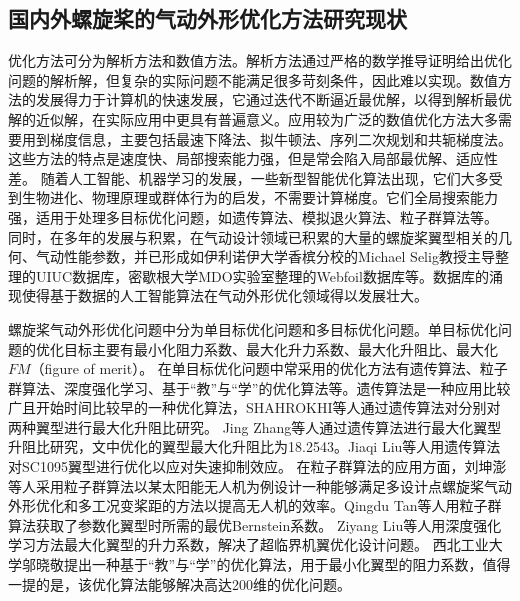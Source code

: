 \vspace{0.8em}
\subsection{国内外螺旋桨的气动外形优化方法研究现状}\label{Sec: optimization}
\vspace{0.8em}

优化方法可分为解析方法和数值方法。解析方法通过严格的数学推导证明给出优化问题的解析解，但复杂的实际问题不能满足很多苛刻条件，因此难以实现。数值方法的发展得力于计算机的快速发展，它通过迭代不断逼近最优解，以得到解析最优解的近似解，在实际应用中更具有普遍意义。应用较为广泛的数值优化方法大多需要用到梯度信息，主要包括最速下降法、拟牛顿法、序列二次规划和共轭梯度法。这些方法的特点是速度快、局部搜索能力强，但是常会陷入局部最优解、适应性差。
随着人工智能、机器学习的发展，一些新型智能优化算法出现，它们大多受到生物进化、物理原理或群体行为的启发，不需要计算梯度。它们全局搜索能力强，适用于处理多目标优化问题，如遗传算法、模拟退火算法、粒子群算法等。
同时，在多年的发展与积累，在气动设计领域已积累的大量的螺旋桨翼型相关的几何、气动性能参数，并已形成如伊利诺伊大学香槟分校的Michael Selig教授主导整理的UIUC数据库，密歇根大学MDO实验室整理的Webfoil数据库等。数据库的涌现使得基于数据的人工智能算法在气动外形优化领域得以发展壮大\cite{Oliveira2023}。

螺旋桨气动外形优化问题中分为单目标优化问题和多目标优化问题。单目标优化问题的优化目标主要有最小化阻力系数、最大化升力系数、最大化升阻比、最大化$FM$（figure of merit）。
在单目标优化问题中常采用的优化方法有遗传算法、粒子群算法、深度强化学习、基于“教”与“学”的优化算法等。遗传算法是一种应用比较广且开始时间比较早的一种优化算法，SHAHROKHI等人通过遗传算法对分别对两种翼型进行最大化升阻比研究\cite{Shahrokhi2007}。
Jing Zhang等人通过遗传算法进行最大化翼型升阻比研究\cite{Zhang2021}，文中优化的翼型最大化升阻比为18.2543。Jiaqi Liu等人用遗传算法对SC1095翼型进行优化以应对失速抑制效应\cite{Liu2023}。
在粒子群算法的应用方面，刘坤澎等人采用粒子群算法以某太阳能无人机为例设计一种能够满足多设计点螺旋桨气动外形优化和多工况变桨距的方法以提高无人机的效率\cite{LiuKP2023}。Qingdu Tan等人用粒子群算法获取了参数化翼型时所需的最优Bernstein系数\cite{Tan2022}。
Ziyang Liu等人用深度强化学习方法最大化翼型的升力系数，解决了超临界机翼优化设计问题\cite{Liu2024}。
西北工业大学邬晓敬提出一种基于“教”与“学”的优化算法\cite{Wu2022}，用于最小化翼型的阻力系数，值得一提的是，该优化算法能够解决高达200维的优化问题。

